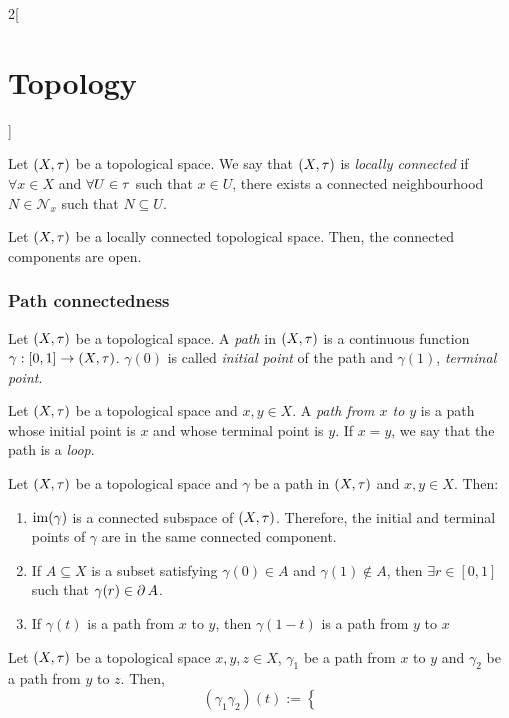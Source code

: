 \documentclass[../../../main.tex]{subfiles}
\begin{document}
\begin{multicols}{2}[\section{Topology}]
\begin{corollary}
    \end{corollary}
    \begin{definition}
        Let $(X,\tau)$ be a topological space. We say that $(X,\tau)$ is \emph{locally connected} if $\forall x\in X$ and $\forall U\in\tau$ such that $x\in U$, there exists a connected neighbourhood $N\in\mathcal{N}_x$ such that $N\subseteq U$.
    \end{definition}
    \begin{prop}
        Let $(X,\tau)$ be a locally connected topological space. Then, the connected components are open.
    \end{prop}
    \subsubsection{Path connectedness}
    \begin{definition}
        Let $(X,\tau)$ be a topological space. A \emph{path} in $(X,\tau)$ is a continuous function $\gamma:[0,1]\rightarrow (X,\tau)$. $\gamma(0)$ is called \emph{initial point} of the path and $\gamma(1)$, \emph{terminal point}.
    \end{definition}
    \begin{definition}
        Let $(X,\tau)$ be a topological space and $x,y\in X$. A \emph{path from $x$ to $y$} is a path whose initial point is $x$ and whose terminal point is $y$. If $x=y$, we say that the path is a \emph{loop}.
    \end{definition}
    \begin{prop}
        Let $(X,\tau)$ be a topological space and $\gamma$ be a path in $(X,\tau)$ and $x,y\in X$. Then:
        \begin{enumerate}
            \item $\operatorname{im}(\gamma)$ is a connected subspace of $(X,\tau)$. Therefore, the initial and terminal points of $\gamma$ are in the same connected component.
            \item If $A\subseteq X$ is a subset satisfying $\gamma(0)\in A$ and $\gamma(1)\notin A$, then $\exists r\in[0,1]$ such that $\gamma(r)\in\operatorname{\partial} A$.
            \item If $\gamma(t)$ is a path from $x$ to $y$, then  $\gamma(1-t)$ is a path from $y$ to $x$
        \end{enumerate}
    \end{prop}
    \begin{prop}
        Let $(X,\tau)$ be a topological space $x,y,z\in X$, $\gamma_1$ be a path from $x$ to $y$ and $\gamma_2$ be a path from $y$ to $z$. Then, $$(\gamma_1\gamma_2)(t):=\left\{
$$
\end{prop}
\end{multicols}
\end{document}
